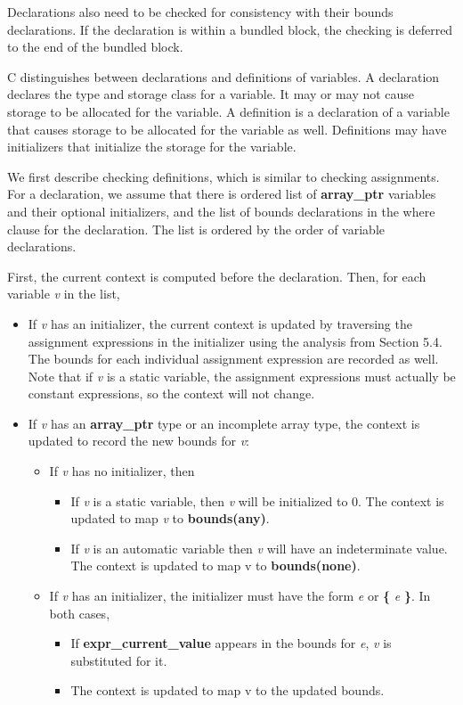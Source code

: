 \documentclass[]{article}
\begin{document}
Declarations also need to be checked for consistency with their bounds
declarations. If the declaration is within a bundled block, the checking
is deferred to the end of the bundled block.

C distinguishes between declarations and definitions of variables. A
declaration declares the type and storage class for a variable. It may
or may not cause storage to be allocated for the variable. A definition
is a declaration of a variable that causes storage to be allocated for
the variable as well. Definitions may have initializers that initialize
the storage for the variable.

We first describe checking definitions, which is similar to checking
assignments. For a declaration, we assume that there is ordered list of
\textbf{array\_ptr} variables and their optional initializers, and the
list of bounds declarations in the where clause for the declaration. The
list is ordered by the order of variable declarations.

First, the current context is computed before the declaration. Then, for
each variable \emph{v} in the list,

\begin{itemize}
\item
  If \emph{v} has an initializer, the current context is updated by
  traversing the assignment expressions in the initializer using the
  analysis from Section 5.4. The bounds for each individual assignment
  expression are recorded as well. Note that if \emph{v} is a static
  variable, the assignment expressions must actually be constant
  expressions, so the context will not change.
\item
  If \emph{v} has an \textbf{array\_ptr} type or an incomplete array
  type, the context is updated to record the new bounds for \emph{v}:

  \begin{itemize}
  \item
    If \emph{v} has no initializer, then

    \begin{itemize}
    \item
      If \emph{v} is a static variable, then \emph{v} will be
      initialized to 0. The context is updated to map \emph{v} to
      \textbf{bounds(any)}.
    \item
      If \emph{v} is an automatic variable then \emph{v} will have an
      indeterminate value. The context is updated to map v to
      \textbf{bounds(none)}.
    \end{itemize}
  \item
    If \emph{v} has an initializer, the initializer must have the form
    \emph{e} or \textbf{\{} \emph{e} \textbf{\}}. In both cases,

    \begin{itemize}
    \item
      If \textbf{expr\_current\_value} appears in the bounds for
      \emph{e}, \emph{v} is substituted for it.
    \item
      The context is updated to map v to the updated bounds.
    \end{itemize}
  \end{itemize}
\end{itemize}
\end{document}
